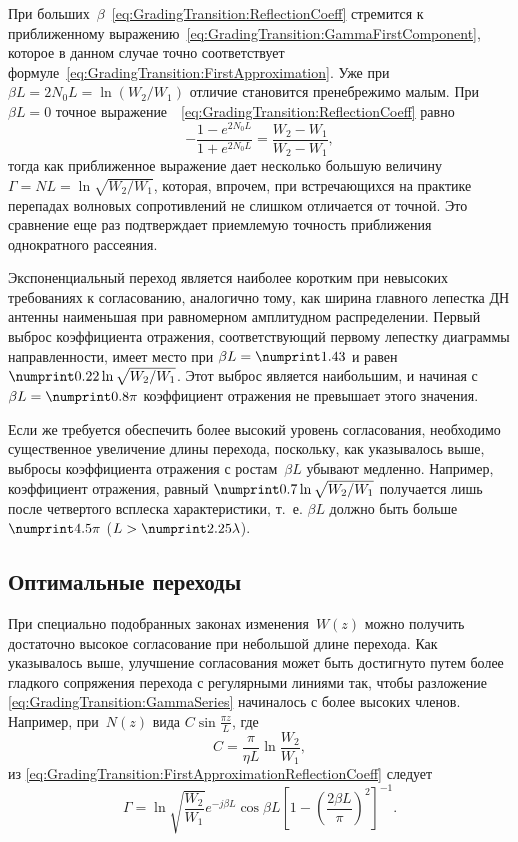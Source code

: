 При больших~$\beta$~\eqref{eq:GradingTransition:ReflectionCoeff} стремится
к приближенному выражению~\eqref{eq:GradingTransition:GammaFirstComponent}, которое
в данном случае точно соответствует формуле~\eqref{eq:GradingTransition:FirstApproximation}. Уже при
$\beta L=2 N_0 L=\ln (W_2/W_1)$ отличие становится пренебрежимо малым.
При $\beta L=0$ точное выражение~~\eqref{eq:GradingTransition:ReflectionCoeff} равно
\begin{equation*}
    -\frac{1-e^{2 N_0 L}}{1+e^{2 N_0 L}} =
     \frac{W_2-W_1}{W_2-W_1},
\end{equation*}
тогда как приближенное выражение дает несколько большую величину
$\Gamma = NL = \ln\sqrt{W_2/W_1}$, которая, впрочем, при встречающихся
на практике перепадах волновых сопротивлений не слишком отличается от точной.
Это сравнение еще раз подтверждает приемлемую точность приближения однократного
рассеяния.

Экспоненциальный переход является наиболее коротким при невысоких требованиях
к согласованию, аналогично тому, как ширина главного лепестка ДН антенны
наименьшая при равномерном амплитудном распределении. Первый выброс коэффициента
отражения, соответствующий первому лепестку диаграммы направленности, имеет
место при $\beta L=\val{1.43}$ и равен $\val{0.22}\ln\sqrt{W_2/W_1}$. Этот
выброс является наибольшим, и начиная с $\beta L=\val{0.8}\pi$ коэффициент
отражения не превышает этого значения.

Если же требуется обеспечить более высокий уровень согласования, необходимо
существенное увеличение длины перехода, поскольку, как указывалось выше, выбросы
коэффициента отражения с ростам~$\beta L$ убывают медленно. Например,
коэффициент отражения, равный $\val{0.7}\ln\sqrt{W_2/W_1}$ получается лишь после
четвертого всплеска характеристики, т.~е. $\beta L$ должно быть больше
$\val{4.5}\pi$ ($L>\val{2.25}\lambda$).


\subsection{Оптимальные переходы}

При специально подобранных законах изменения~$W(z)$ можно получить достаточно
высокое согласование при небольшой длине перехода. Как указывалось выше,
улучшение согласования может быть достигнуто путем более гладкого сопряжения
перехода с регулярными линиями так, чтобы разложение \eqref{eq:GradingTransition:GammaSeries} начиналось с более
высоких членов. Например, при~$N(z)$ вида $C\sin\frac{\pi z}{L}$, где
\begin{equation*}
    C = \frac{\pi}{\eta L} \ln \frac{W_2}{W_1},
\end{equation*}
из \eqref{eq:GradingTransition:FirstApproximationReflectionCoeff} следует
\begin{equation*}
    \Gamma = \ln \sqrt{\frac{W_2}{W_1}} e^{-j\beta L} \cos{\beta L}
    \left[
        1 - \left( \frac{2\beta L}{\pi} \right) ^2
    \right]^{-1}.
\end{equation*}

